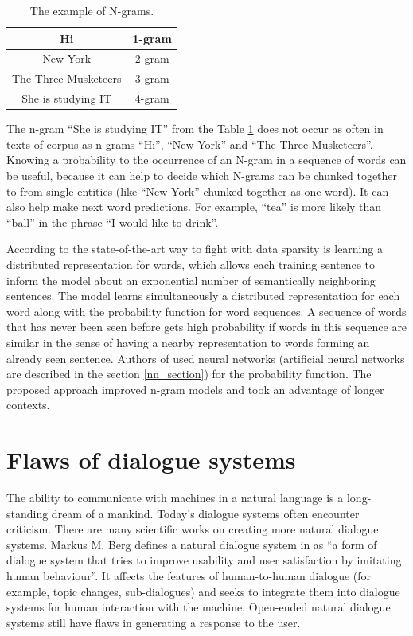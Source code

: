 \begin{table}[ht]
  \centering
   \begin{tabular}{|c|c|} 
   \hline
    Hi & 1-gram \\
   \hline
    New York & 2-gram \\
   \hline
   The Three Musketeers & 3-gram \\
   \hline
   She is studying IT & 4-gram \\
   \hline
   \end{tabular}
   \caption{The example of N-grams.}
  \label{tab:n_gram}
\end{table}

The n-gram ``She is studying IT'' from the Table \ref{tab:n_gram} does not occur as often in texts of corpus as n-grams ``Hi'', ``New York'' and ``The Three Musketeers''. Knowing a probability to the occurrence of an N-gram in a sequence of words can be useful, because it can help to decide which N-grams can be chunked together to from single entities (like ``New York'' chunked together as one word). It can also help make next word predictions. For example, ``tea'' is more likely than ``ball'' in the phrase ``I would like to drink''.

According to \cite{bengio2003neural} the state-of-the-art way to fight with data sparsity is learning a distributed representation for words, which allows each training sentence to inform the model about an exponential number of semantically neighboring sentences. The model learns simultaneously a distributed representation for each word along with the probability function for word sequences. A sequence of words that has never been seen before gets high probability if words in this sequence are similar in the sense of having a nearby representation to words forming an already seen sentence. Authors of \cite{bengio2003neural} used neural networks (artificial neural networks are described in the section \ref{nn_section}) for the probability function. The proposed approach improved n-gram models and took an advantage of longer contexts.

\section{Flaws of dialogue systems}\label{nlg_ds_problems}
The ability to communicate with machines in a natural language is a long-standing dream of a mankind. Today's dialogue systems often encounter criticism. There are many scientific works on creating more natural dialogue systems. Markus M. Berg defines a natural dialogue system in \cite{berg2014modelling} as ``a form of dialogue system that tries to improve usability and user satisfaction by imitating human behaviour''. It affects the features of human-to-human dialogue (for example, topic changes, sub-dialogues) and seeks to integrate them into dialogue systems for human interaction with the machine. Open-ended natural dialogue systems still have flaws in generating a response to the user.

